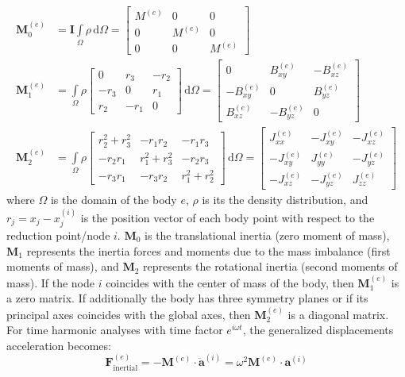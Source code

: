 \documentclass[a4paper,fleqn]{book}
\begin{document}
\begin{align}
\mathbf{M}_0^{(e)} &= \mathbf{I} \int\limits_{\Omega}\rho\,\mathrm{d}\Omega = 
\left[
\begin{array}{ccc}
M^{(e)} & 0 & 0 \\
0 & M^{(e)} & 0 \\
0 & 0 & M^{(e)}
\end{array}
\right]
\\
\mathbf{M}_1^{(e)} &= 
\int\limits_{\Omega}
\rho
\left[
\begin{array}{ccc}
0 & r_3 & -r_2 \\
-r_3 & 0 & r_1 \\
r_2 & -r_1 & 0
\end{array}
\right]
\,\mathrm{d}\Omega
=
\left[
\begin{array}{ccc}
0 & B_{xy}^{(e)} & -B_{xz}^{(e)} \\
-B_{xy}^{(e)} & 0 & B_{yz}^{(e)} \\
B_{xz}^{(e)} & -B_{yz}^{(e)} & 0
\end{array}
\right]
\\
\mathbf{M}_2^{(e)} &= 
\int\limits_{\Omega}
\rho
\left[
\begin{array}{ccc}
r_2^2+r_3^2 & -r_1r_2 & -r_1r_3 \\
-r_2r_1 & r_1^2+r_3^2 & -r_2r_3 \\
-r_3r_1 & -r_3r_2 & r_1^2+r_2^2
\end{array}
\right]
\,\mathrm{d}\Omega
=\left[
\begin{array}{ccc}
J_{xx}^{(e)} & -J_{xy}^{(e)} & -J_{xz}^{(e)} \\
-J_{xy}^{(e)} & J_{yy}^{(e)} & -J_{yz}^{(e)} \\
-J_{xz}^{(e)} & -J_{yz}^{(e)} & J_{zz}^{(e)}
\end{array}
\right]
\end{align}
where $\Omega$ is the domain of the body $e$, $\rho$ is its the density distribution,  and $r_j=x_j-x_j^{(i)}$ is the position vector of each body point with respect to the reduction point/node $i$. $\mathbf{M}_0$ is the translational inertia (zero moment of mass), $\mathbf{M}_1$ represents the inertia forces and moments due to the mass imbalance (first moments of mass), and $\mathbf{M}_2$ represents the rotational inertia (second moments of mass). If the node $i$ coincides with the center of mass of the body, then $\mathbf{M}_1^{(e)}$ is a zero matrix. If additionally the body has three symmetry planes or if its principal axes coincides with the global axes, then $\mathbf{M}_2^{(e)}$ is a diagonal matrix. For time harmonic analyses with time factor $e^{i\omega t}$, the generalized displacements acceleration becomes:
\begin{equation}
\mathbf{F}_\mathrm{inertial}^{(e)}
=
-
\mathbf{M}^{(e)}
\cdot
\ddot{\mathbf{a}}^{(i)}
=
\omega^2
\mathbf{M}^{(e)}
\cdot
\mathbf{a}^{(i)}
\end{equation}
\end{document}
